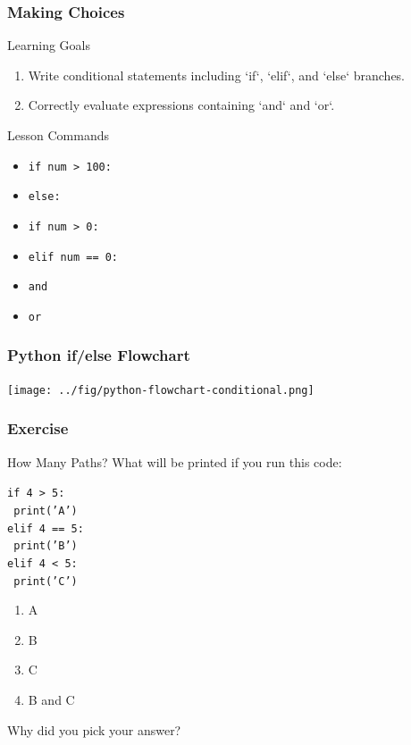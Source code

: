 \documentclass{beamer}
\begin{document}
\begin{frame}[label=conditionals]
  \frametitle{Making Choices}
  \begin{block}{Learning Goals}
    \begin{enumerate}
      \item Write conditional statements including `if`, `elif`, and `else` branches.
      \item Correctly evaluate expressions containing `and` and `or`.
    \end{enumerate}
  \end{block}
  \begin{block}{Lesson Commands}
    \begin{itemize}
      \item \texttt{if num > 100:}
      \item \texttt{else:}
      \item \texttt{if num > 0:}
      \item \texttt{elif num == 0:}
      \item \texttt{and}
      \item \texttt{or}
    \end{itemize}
  \end{block}
\end{frame}


\begin{frame}
  \frametitle{Python if/else Flowchart}
  \texttt{[image: ../fig/python-flowchart-conditional.png]}
\end{frame}


\begin{frame}
  \frametitle{Exercise}
  \begin{block}{How Many Paths?}
    What will be printed if you run this code:

    \texttt{if 4 > 5:}\\
    \texttt{    print('A')}\\
    \texttt{elif 4 == 5:}\\
    \texttt{    print('B')}\\
    \texttt{elif 4 < 5:}\\
    \texttt{    print('C')}\\

    \begin{enumerate}
      \item A
      \item B
      \item C
      \item B and C
    \end{enumerate}

    Why did you pick your answer?

  \end{block}
\end{frame}
\end{document}
